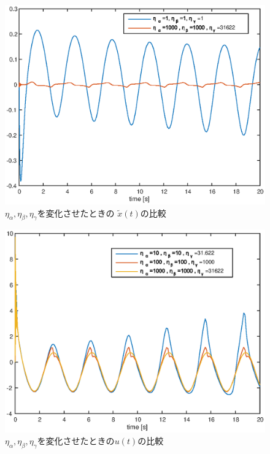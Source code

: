 \documentclass[a4paper,12pt]{jarticle}
\begin{document}
%
%
\begin{figure}[htb]
    \begin{center}
	 \includegraphics[width=140mm]{fig/x_tilde_eta_all.eps}
	 \caption{$\eta_\alpha,\eta_\beta,\eta_\gamma$を変化させたときの
	 $\tilde{x}(t)$の比較}
        \label{fig:x_tilde_eta_all}
    \end{center}
\end{figure}
%
%
\begin{figure}[htb]
    \begin{center}
	 \includegraphics[width=140mm]{fig/eta_hikaku.eps}
        \caption{$\eta_\alpha,\eta_\beta,\eta_\gamma$を変化させたときの$u(t)$の比較}
        \label{fig:eta_hikaku}
    \end{center}
\end{figure}
\end{document}
